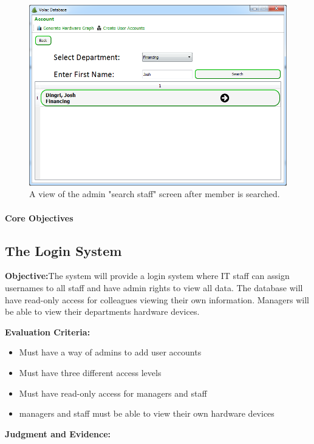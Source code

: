 \begin{figure}[H]
    \includegraphics[width=\textwidth]{./Evaluation/Images/afteradv.png}
    \caption{A view of the admin "search staff" screen after member is searched.} 
\end{figure}

\paragraph{Core Objectives}

\subsection{The Login System}

\textbf{Objective:}The system will provide a login system where IT staff can assign usernames to all staff and have admin rights to view all data. The database will have read-only access for colleagues viewing their own information. Managers will be able to view their departments hardware devices.

\textbf{Evaluation Criteria:}
\begin{itemize}
\item{Must have a way of admins to add user accounts}
\item{Must have three different access levels}
\item{Must have read-only access for managers and staff}
\item{managers and staff must be able to view their own hardware devices}
\end{itemize}

\textbf{Judgment and Evidence:}



